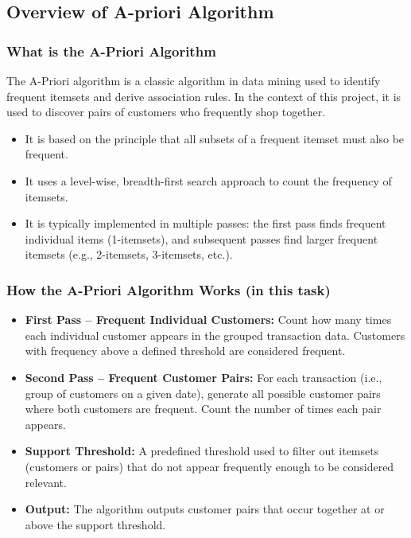 \subsection{Overview of A-priori Algorithm}
\label{subsec:overview-of-a-priori-algorithm}

\subsubsection{What is the A-Priori Algorithm}

The A-Priori algorithm is a classic algorithm in data mining used to identify frequent itemsets and derive association rules.
In the context of this project, it is used to discover pairs of customers who frequently shop together.

\begin{itemize}
    \item It is based on the principle that all subsets of a frequent itemset must also be frequent.
    \item It uses a level-wise, breadth-first search approach to count the frequency of itemsets.
    \item It is typically implemented in multiple passes: the first pass finds frequent individual items (1-itemsets), and subsequent passes find larger frequent itemsets (e.g., 2-itemsets, 3-itemsets, etc.).
\end{itemize}

\subsubsection{How the A-Priori Algorithm Works (in this task)}

\begin{itemize}
    \item \textbf{First Pass – Frequent Individual Customers:} Count how many times each individual customer appears in the grouped transaction data.
    Customers with frequency above a defined threshold are considered frequent.
    \item \textbf{Second Pass – Frequent Customer Pairs:} For each transaction (i.e., group of customers on a given date), generate all possible customer pairs where both customers are frequent.
    Count the number of times each pair appears.
    \item \textbf{Support Threshold:} A predefined threshold used to filter out itemsets (customers or pairs) that do not appear frequently enough to be considered relevant.
    \item \textbf{Output:} The algorithm outputs customer pairs that occur together at or above the support threshold.
\end{itemize}

